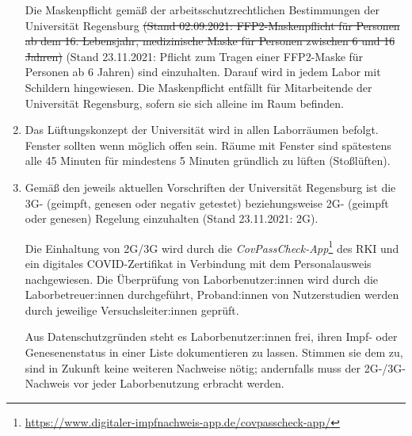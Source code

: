 \begin{enumerate}
{    Die Maskenpflicht gemäß der arbeitsschutzrechtlichen Bestimmungen der Universität Regensburg 
        \sout{(Stand 02.09.2021: FFP2-Maskenpflicht für Personen ab dem 16. Lebensjahr, medizinische Maske für Personen zwischen 6 und 16 Jahren)}
    (Stand 23.11.2021: Pflicht zum Tragen einer FFP2-Maske für Personen ab 6 Jahren)
    sind einzuhalten.
    Darauf wird in jedem Labor mit Schildern hingewiesen.
    Die Maskenpflicht entfällt für Mitarbeitende der Universität Regensburg, sofern sie sich alleine im Raum befinden.}
    \item{Das Lüftungskonzept der Universität wird in allen Laborräumen befolgt.
    Fenster sollten wenn möglich offen sein.
    Räume mit Fenster sind spätestens alle 45 Minuten für mindestens 5 Minuten gründlich zu lüften (Stoßlüften).}
\item{Gemäß den jeweils aktuellen Vorschriften der Universität Regensburg ist die 3G- (geimpft, genesen oder negativ getestet) beziehungsweise 2G- (geimpft oder genesen) Regelung einzuhalten (Stand 23.11.2021: 2G).

    Die Einhaltung von 2G/3G wird durch die \emph{CovPassCheck-App}\footnote{\url{https://www.digitaler-impfnachweis-app.de/covpasscheck-app/}} des RKI und ein digitales COVID-Zertifikat in Verbindung mit dem Personalausweis nachgewiesen.
    Die Überprüfung von Laborbenutzer:innen wird durch die Laborbetreuer:innen durchgeführt, Proband:innen von Nutzerstudien werden durch jeweilige Versuchsleiter:innen geprüft.

    Aus Datenschutzgründen steht es Laborbenutzer:innen frei, ihren Impf- oder Genesenenstatus in einer Liste dokumentieren zu lassen.
    Stimmen sie dem zu, sind in Zukunft keine weiteren Nachweise nötig; andernfalls muss der 2G-/3G-Nachweis vor jeder Laborbenutzung erbracht werden.
    }
\end{enumerate}
